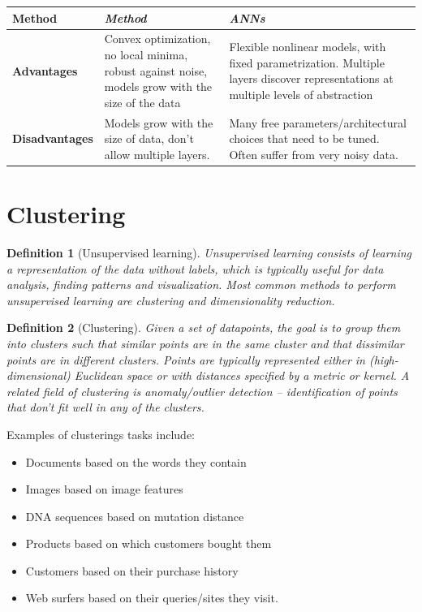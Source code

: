 \documentclass[a4paper,10pt,twoside]{article}
\newtheorem{definition}{Definition}[section]
\begin{document}
\begin{table}
    \centering
    \begin{tabulary}{\textwidth}{Lp{170pt}p{170pt}}
        \toprule
        \textbf{Method} & \textit{Method} & \textit{ANNs}\\
        \midrule
        \textbf{Advantages} & Convex optimization, no local minima, robust against noise, models grow with the size of the data & Flexible nonlinear models, with fixed parametrization. Multiple layers discover representations at multiple levels of abstraction\\
        \textbf{Disadvantages} & Models grow with the size of data, don't allow multiple layers. & Many free parameters/architectural choices that need to be tuned. Often suffer from very noisy data. \\
    \end{tabulary}
    \label{kernels-vs-anns}
\end{table}

\section{Clustering}

\begin{definition}[Unsupervised learning]
    Unsupervised learning consists of learning a representation of the data without labels, which is typically useful for data analysis, finding patterns and visualization. Most common methods to perform unsupervised learning are clustering and dimensionality reduction.
\end{definition}

\begin{definition}[Clustering]
   Given a set of datapoints, the goal is to group them into clusters such that similar points are in the same cluster and that dissimilar points are in different clusters. Points are typically represented either in (high-dimensional) Euclidean space or with distances specified by a metric or kernel. A related field of clustering is anomaly/outlier detection -- identification of points that don't fit well in any of the clusters.
\end{definition}

Examples of clusterings tasks include:
\begin{itemize}
    \item Documents based on the words they contain
    \item Images based on image features
    \item DNA sequences based on mutation distance
    \item Products based on which customers bought them
    \item Customers based on their purchase history
    \item Web surfers based on their queries/sites they visit.
\end{itemize}
\end{document}
